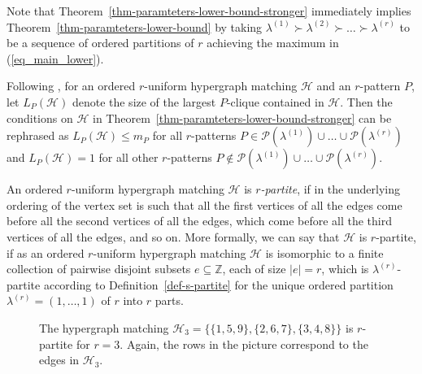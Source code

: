 \documentclass[11pt]{article}
\theoremstyle{definition}
\numberwithin{equation}{section}
\numberwithin{figure}{section}
\newcommand{\su}{\subseteq}
\newcommand{\Z}{\mathbb{Z}}
\newcommand{\HH}{\mathcal{H}}
\newcommand{\PP}{\mathcal{P}}
\begin{document}
Note that Theorem~\ref{thm-paramteters-lower-bound-stronger} immediately implies Theorem~\ref{thm-paramteters-lower-bound} by taking $\lambda^{(1)} \succ \lambda^{(2)} \succ \ldots \succ \lambda^{(r)}$ to be a sequence of ordered partitions of $r$ achieving the maximum in (\ref{eq_main_lower}).

Following \cite{AJKS}, for an ordered $r$-uniform hypergraph matching $\HH$ and an $r$-pattern $P$, let $L_P(\HH)$ denote the size of the largest $P$-clique contained in $\HH$. Then the conditions on $\HH$ in Theorem~\ref{thm-paramteters-lower-bound-stronger} can be rephrased as $L_P(\HH)\le m_P$ for all $r$-patterns $P\in \PP(\lambda^{(1)})\cup\dots\cup \PP(\lambda^{(r)})$ and $L_P(\HH)=1$ for all other $r$-patterns $P\not\in \PP(\lambda^{(1)})\cup\dots\cup \PP(\lambda^{(r)})$.

An ordered $r$-uniform hypergraph matching $\HH$ is \emph{$r$-partite}, if in the underlying ordering of the vertex set is such that all the first vertices of all the edges come before all the second vertices of all the edges, which come before all the third vertices of all the edges, and so on. More formally, we can say that $\HH$ is $r$-partite, if as an ordered $r$-uniform hypergraph matching $\HH$ is isomorphic to a finite collection of pairwise disjoint subsets $e\su \Z$, each of size $|e|=r$, which is $\lambda^{(r)}$-partite according to Definition~\ref{def-s-partite} for the unique ordered partition $\lambda^{(r)}=(1,\dots,1)$ of $r$ into $r$ parts.

\begin{figure}
    \centering
    \caption{The hypergraph matching $\HH_3 = \{ \{1,5,9\}, \{2,6,7\},\{3, 4,8\} \}$ is $r$-partite for $r=3$. Again, the rows in the picture correspond to the edges in $\HH_3$.}
    \label{fig:figure-example-r-partite}
\end{figure}
\end{document}
